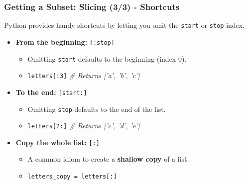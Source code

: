 \documentclass{beamer}
\begin{document}
\begin{frame}[fragile]
    \frametitle{Getting a Subset: Slicing (3/3) - Shortcuts}
    
    Python provides handy shortcuts by letting you omit the \texttt{start} or \texttt{stop} index.
    
    \begin{itemize}
        \item \textbf{From the beginning:} \texttt{[:stop]}
        \begin{itemize}
            \item Omitting \texttt{start} defaults to the beginning (index 0).
            \item \texttt{letters[:3]} \textit{\# Returns ['a', 'b', 'c']}
        \end{itemize}
        
        \bigskip
        
        \item \textbf{To the end:} \texttt{[start:]}
        \begin{itemize}
            \item Omitting \texttt{stop} defaults to the end of the list.
            \item \texttt{letters[2:]} \textit{\# Returns ['c', 'd', 'e']}
        \end{itemize}
        
        \bigskip
        
        \item \textbf{Copy the whole list:} \texttt{[:]}
        \begin{itemize}
            \item A common idiom to create a \textbf{shallow copy} of a list.
            \item \texttt{letters\_copy = letters[:]}
        \end{itemize}
    \end{itemize}
    
\end{frame}
\end{document}
